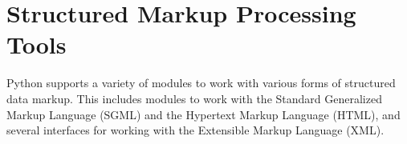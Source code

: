 \chapter{Structured Markup Processing Tools
         \label{markup}}

Python supports a variety of modules to work with various forms of
structured data markup.  This includes modules to work with the
Standard Generalized Markup Language (SGML) and the Hypertext Markup
Language (HTML), and several interfaces for working with the
Extensible Markup Language (XML).

\localmoduletable
